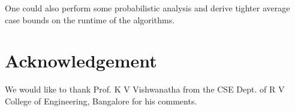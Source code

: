 \documentclass{article}
\begin{document}
One could also perform some probabilistic analysis and derive tighter average case bounds on the runtime of the algorithms.

\section*{Acknowledgement}

We would like to thank Prof. K V Vishwanatha from the CSE Dept. of R V College of Engineering, Bangalore for his comments.



\label{lastpage}
\end{document}
